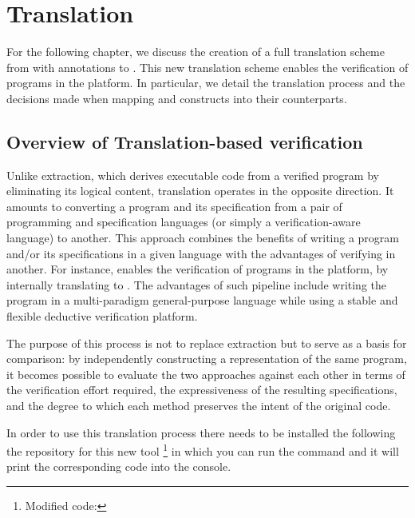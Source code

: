 
%

\chapter{Translation}
\label{cha:Translation}

For the following chapter, we discuss the creation of a full translation scheme from \cml with \gospel annotations to \whyml. This new
translation scheme enables the verification of \cml programs in the \whythree platform. In particular, we detail the translation process
and the decisions made when mapping \cml and \gospel constructs into their \whyml counterparts.

\section{Overview of Translation-based verification}

Unlike extraction, which derives executable code from a verified program by eliminating its logical content, translation operates in the
opposite direction. It amounts to converting a program and its specification from a pair of programming and specification languages (or
simply a verification-aware language) to another. This approach combines the benefits of writing a program and/or its specifications in
a given language with the advantages of verifying in another. For instance, \cameleer enables the verification of \ocaml programs in
the \whythree platform, by internally translating to \whyml. The advantages of such pipeline include writing the program in a multi-paradigm 
general-purpose language while using a stable and flexible deductive verification platform.

The purpose of this process is not to replace extraction but to serve as a basis for comparison: by independently constructing a \whyml
representation of the same program, it becomes possible to evaluate the two approaches against each other in terms of the verification
effort required, the expressiveness of the resulting specifications, and the degree to which each method preserves the intent of the
original code. 

In order to use this translation process there needs to be installed the following the repository for this new tool 
\footnote{Modified \cameleer code: } in which you can run the command
 and it will print the corresponding \whyml code into the console.

